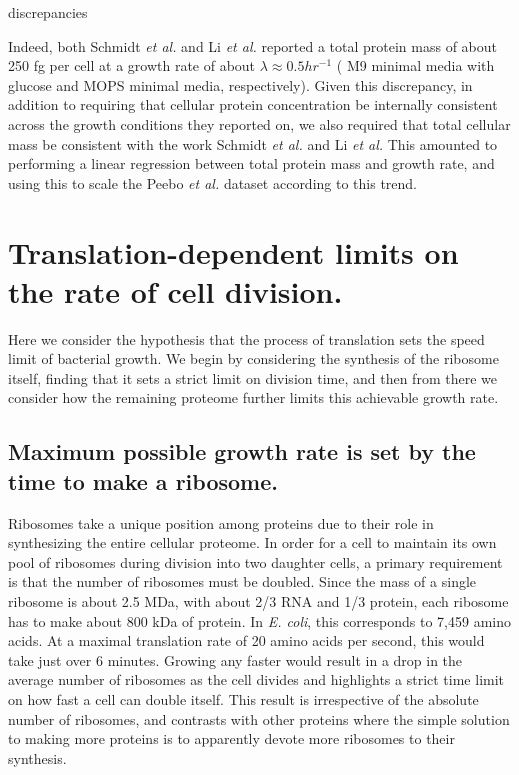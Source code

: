 discrepancies \documentclass[11pt, letterpaper]{article}
\begin{document}
Indeed, both Schmidt {\it et al.} and Li {\it et al.} reported a total protein mass of about
250 fg per cell at a growth rate of about $\lambda \approx 0.5 hr^{-1}$ ( M9
minimal media with glucose and MOPS minimal media, respectively). Given this
discrepancy, in addition to requiring that cellular protein concentration be
internally consistent across the growth conditions they reported on, we also
required that total cellular mass be consistent with the work Schmidt {\it et al.} and
Li {\it et al.} This amounted to performing a linear regression between total protein
mass and growth rate, and using this to scale the Peebo {\it et al.} dataset according
to this trend.



%
\newpage
\section{Translation-dependent limits on the rate of cell division.}

Here we consider the hypothesis that the process of translation sets the speed
limit of bacterial growth. We begin by considering the synthesis of the ribosome
itself, finding that it sets a strict limit on division time, and then from there we
consider how the remaining proteome further limits this achievable growth rate.

\subsection{Maximum possible growth rate is set by the time to make a ribosome.}


Ribosomes take a unique position among proteins due to their role in
synthesizing the entire cellular proteome. In order for a cell to maintain its
own pool of ribosomes during division into two daughter cells, a primary
requirement is that the number of ribosomes must be doubled.  Since the  mass of
a single ribosome is about 2.5 MDa, with about 2/3 RNA and 1/3 protein, each
ribosome has to make about 800 kDa of protein. In {\it E. coli},
this corresponds to 7,459 amino acids. At a maximal translation rate of 20 amino
acids per second, this would take just over 6 minutes.  Growing any faster would
result in a drop in the average number of ribosomes as the cell divides and
highlights a strict time limit on how fast a cell can double itself.  This
result is irrespective of the absolute number of ribosomes, and contrasts with
other proteins where the simple solution to making more proteins is to
apparently devote more ribosomes to their synthesis.
\end{document}
